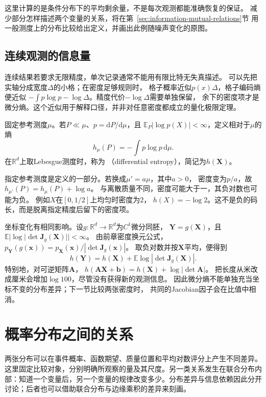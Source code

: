这里计算的是条件分布下的平均剩余量，不是每次观测都能准确恢复的保证。
减少部分怎样描述两个变量的关系，将在第~\ref{sec:information-mutual-relations}节
用一般测度上的分布比较给出定义，并画出此例随噪声变化的原图。

\subsection{连续观测的信息量}
\label{sec:information-continuous-information}

连续结果若要求无限精度，单次记录通常不能用有限比特无失真描述。
可以先把实轴分成宽度\(\Delta\)的小格；在密度足够规则时，
格子概率近似\(p(x)\Delta\)，格子编码熵便近似
\(-\int p\log p-\log\Delta\)。精度代价\(-\log\Delta\)需要单独保留，
余下的密度项才是微分熵。这个近似用于解释口径，并非对任意密度都成立的量化极限定理。

\begin{definition}[微分熵]
\label{def:information-differential-entropy}
固定参考测度\(\mu\)。若\(P\ll\mu\)、\(p=\mathrm dP/\mathrm d\mu\)，且
\(\mathbb E_P|\log p(X)|<\infty\)，定义相对于\(\mu\)的熵
\[
  h_\mu(P)=-\int p\log p\,\mathrm d\mu.
\]
在\(\mathbb R^d\)上取Lebesgue测度时，称为
（differential entropy），简记为\(h(\bm X)\)。
\end{definition}

指定参考测度是定义的一部分。若换成\(\mu'=a\mu\)，其中\(a>0\)，
密度变为\(p/a\)，故\(h_{\mu'}(P)=h_\mu(P)+\log a\)。
与离散质量不同，密度可能大于一，其负对数也可能为负。
例如\(X\)在\([0,1/2]\)上均匀时密度为\(2\)，
\(h(X)=-\log2\)。这不是负的码长，而是脱离指定精度后留下的密度项。

坐标变化有相同影响。设\(g:\mathbb R^d\to\mathbb R^d\)为\(C^1\)微分同胚，
\(\bm Y=g(\bm X)\)，且
\(\mathbb E|\log|\det\bm J_g(\bm X)||<\infty\)。
由前章密度换元公式，
\(p_{\bm Y}(g(\bm x))=p_{\bm X}(\bm x)/|\det\bm J_g(\bm x)|\)。
取负对数并按\(\bm X\)平均，便得到
\begin{equation}
  h(\bm Y)=h(\bm X)+
  \mathbb E\log|\det\bm J_g(\bm X)|.
  \label{eq:information-differential-entropy-transform}
\end{equation}
特别地，对可逆矩阵\(\bm A\)，
\(h(\bm A\bm X+\bm b)=h(\bm X)+\log|\det\bm A|\)。
把长度从米改成厘米会增加\(\log100\)，尽管没有获得新的观测信息。
因此微分熵不能单独充当坐标不变的分布差异；下一节比较两张密度时，
共同的Jacobian因子会在比值中相消。

\section{概率分布之间的关系}
\label{sec:information-distribution-relations}
\label{sec:information-comparison-identification}
两张分布可以在事件概率、函数期望、质量位置和平均对数评分上产生不同差异。这里固定比较对象，分别明确所观察的量及其尺度。另一类关系发生在联合分布内部：知道一个变量后，另一个变量的规律改变多少。分布差异与信息依赖因此分开讨论；后者也可以借助联合分布与边缘乘积的差异来刻画。

